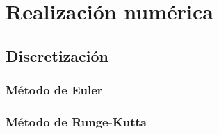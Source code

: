 \section{Realización numérica}
\subsection{Discretización}
\subsubsection{Método de Euler}
\subsubsection{Método de Runge-Kutta}
